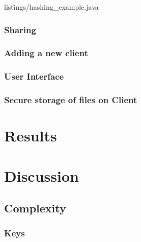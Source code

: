 \documentclass[pdftex,english,10pt,b5paper,twoside]{book}
\begin{document}

{listings/hashing_example.java}

\subsection{Sharing}

\subsection{Adding a new client}

\subsection{User Interface}


\subsection{Secure storage of files on Client}

\chapter{Results}

\chapter{Discussion}
\section{Complexity}

\subsection{Keys}
\end{document}
